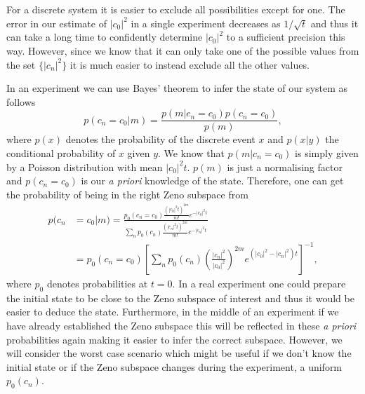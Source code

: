 For a discrete system it is easier to exclude all possibilities except
for one. The error in our estimate of $|c_0|^2$ in a single experiment
decreases as $1/\sqrt{t}$ and thus it can take a long time to
confidently determine $|c_0|^2$ to a sufficient precision this
way. However, since we know that it can only take one of the possible
values from the set $\{|c_n|^2 \}$ it is much easier to instead
exclude all the other values.

In an experiment we can use Bayes' theorem to infer the state of our
system as follows
\begin{equation}
	p(c_n = c_0 | m) = \frac{ p(m | c_n = c_0) p(c_n = c_0) }{ p(m) },
\end{equation}
where $p(x)$ denotes the probability of the discrete event $x$ and
$p(x|y)$ the conditional probability of $x$ given $y$. We know that
$p(m | c_n = c_0)$ is simply given by a Poisson distribution with mean
$|c_0|^2 t$. $p(m)$ is just a normalising factor and $p(c_n = c_0)$ is
our \emph{a priori} knowledge of the state. Therefore, one can get the
probability of being in the right Zeno subspace from
\begin{align}
  p(c_n & = c_0 | m) = \frac{ p_0(c_n = c_0) \frac{ \left( |c_0|^2 t
          \right)^{2m} } {m!} e^{-|c_0|^2 t}} {\sum_n p_0(c_n) \frac{
          \left( |c_n|^2 t \right)^{2m} } {m!} e^{-|c_n|^2 t}} \nonumber \\
	& = p_0(c_n = c_0) \left[ \sum_n p_0(c_n) \left( \frac{
          |c_n|^2 } { |c_0|^2 } \right)^{2m} e^{\left( |c_0|^2 -
          |c_n|^2 \right) t} \right]^{-1},
\end{align}
where $p_0$ denotes probabilities at $t = 0$. In a real experiment one
could prepare the initial state to be close to the Zeno subspace of
interest and thus it would be easier to deduce the state. Furthermore,
in the middle of an experiment if we have already established the Zeno
subspace this will be reflected in these \emph{a priori} probabilities
again making it easier to infer the correct subspace. However, we will
consider the worst case scenario which might be useful if we don't
know the initial state or if the Zeno subspace changes during the
experiment, a uniform $p_0(c_n)$.

